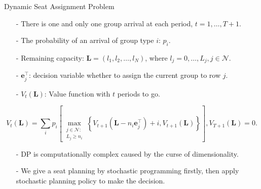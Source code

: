   \begin{frame}{Dynamic Seat Assignment Problem}
    \centering
    \small
    \begin{itemize}
    \item[-] There is one and only one group arrival at each period, $t = 1, \ldots, T+1$. 
    \item[-] The probability of an arrival of group type $i$: $p_i$.  
    \item[-] Remaining capacity: $\mathbf{L} = (l_1, l_2, \ldots, l_{N})$, where $l_j =0,\ldots, L_j, j\in \mathcal{N}$.
    \item[-] $\mathbf{e}_j^{\intercal}$: decision variable whether to assign the current group to row $j$.
    \item[-] $V_{t}(\mathbf{L})$: Value function with $t$ periods to go.
    \end{itemize}

    $$V_{t}(\mathbf{L}) = \sum_{i} p_i \left[\max_{\substack{j \in \mathcal{N}: \\ L_j \geqslant {n}_{i}}}\left\{V_{t+1}\left(\mathbf{L}- n_{i}\mathbf{e}_j^{\intercal} \right)+ i, V_{t+1}(\mathbf{L})\right\}\right], V_{T+1}(\mathbf{L}) = 0.$$
    \small
    \begin{itemize}
      \item[-] DP is computationally complex caused by the curse of dimensionality.
      \item[-] We give a seat planning by stochastic programming firstly, then apply stochastic planning policy to make the decision.
    \end{itemize}
\end{frame}